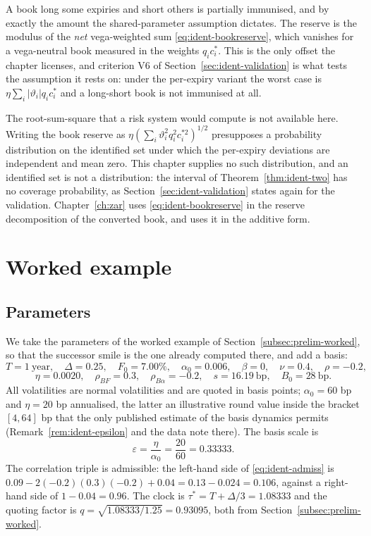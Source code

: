 \documentclass[../../../main.tex]{subfiles}
\begin{document}
A book long some expiries and short others is partially immunised, and by exactly the amount the shared-parameter assumption dictates. The reserve is the modulus of the \emph{net} vega-weighted sum \eqref{eq:ident-bookreserve}, which vanishes for a vega-neutral book measured in the weights $q_ic^*_i$. This is the only offset the chapter licenses, and criterion V6 of Section~\ref{sec:ident-validation} is what tests the assumption it rests on: under the per-expiry variant the worst case is $\eta\sum_i|\vartheta_i|q_ic^*_i$ and a long-short book is not immunised at all.

The root-sum-square that a risk system would compute is not available here. Writing the book reserve as $\eta(\sum_i\vartheta_i^2q_i^2c^{*2}_i)^{1/2}$ presupposes a probability distribution on the identified set under which the per-expiry deviations are independent and mean zero. This chapter supplies no such distribution, and an identified set is not a distribution: the interval of Theorem~\ref{thm:ident-two} has no coverage probability, as Section~\ref{sec:ident-validation} states again for the validation. Chapter~\ref{ch:zar} uses \eqref{eq:ident-bookreserve} in the reserve decomposition of the converted book, and uses it in the additive form.

\section{Worked example}\label{sec:ident-example}

\subsection{Parameters}

We take the parameters of the worked example of Section~\ref{subsec:prelim-worked}, so that the successor smile is the one already computed there, and add a basis:
\[
T=1\ \text{year},\quad \Delta=0.25,\quad F_0=7.00\%,\quad \alpha_0=0.006,\quad \beta=0,\quad \nu=0.4,\quad \rho=-0.2,
\]
\[
\eta=0.0020,\quad \rho_{BF}=0.3,\quad \rho_{B\alpha}=-0.2,\quad s=16.19\ \text{bp},\quad B_0=28\ \text{bp}.
\]
All volatilities are normal volatilities and are quoted in basis points; $\alpha_0=60$ bp and $\eta=20$ bp annualised, the latter an illustrative round value inside the bracket $[4,64]$ bp that the only published estimate of the basis dynamics permits (Remark~\ref{rem:ident-epsilon} and the data note there). The basis scale is
\[
\varepsilon=\frac{\eta}{\alpha_0}=\frac{20}{60}=0.33333 .
\]
The correlation triple is admissible: the left-hand side of \eqref{eq:ident-admiss} is $0.09-2(-0.2)(0.3)(-0.2)+0.04=0.13-0.024=0.106$, against a right-hand side of $1-0.04=0.96$. The clock is $\tau^*=T+\Delta/3=1.08333$ and the quoting factor is $q=\sqrt{1.08333/1.25}=0.93095$, both from Section~\ref{subsec:prelim-worked}.
\end{document}
